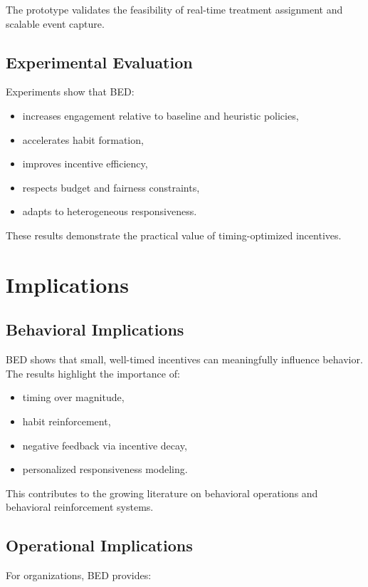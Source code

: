The prototype validates the feasibility of real-time treatment assignment and
scalable event capture.

\subsection{Experimental Evaluation}
Experiments show that BED:

\begin{itemize}
    \item increases engagement relative to baseline and heuristic policies,
    \item accelerates habit formation,
    \item improves incentive efficiency,
    \item respects budget and fairness constraints,
    \item adapts to heterogeneous responsiveness.
\end{itemize}

These results demonstrate the practical value of timing-optimized incentives.

\section{Implications}

\subsection{Behavioral Implications}
BED shows that small, well-timed incentives can meaningfully influence behavior.
The results highlight the importance of:

\begin{itemize}
    \item timing over magnitude,
    \item habit reinforcement,
    \item negative feedback via incentive decay,
    \item personalized responsiveness modeling.
\end{itemize}

This contributes to the growing literature on behavioral operations and
behavioral reinforcement systems.

\subsection{Operational Implications}
For organizations, BED provides:

